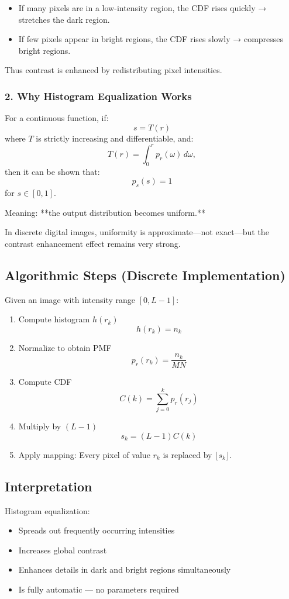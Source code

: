 \documentclass{AnantDocumentation}
\begin{document}
\begin{itemize}
\item If many pixels are in a low-intensity region, the CDF rises quickly → stretches the dark region.
\item If few pixels appear in bright regions, the CDF rises slowly → compresses bright regions.
\end{itemize}

Thus contrast is enhanced by redistributing pixel intensities.

\subsubsection{2. Why Histogram Equalization Works}

For a continuous function, if:
\[
s = T(r)
\]
where \(T\) is strictly increasing and differentiable, and:
\[
T(r) = \int_{0}^{r} p_r(\omega) \, d\omega,
\]
then it can be shown that:
\[
p_s(s) = 1
\]
for \(s \in [0,1]\).  

Meaning: **the output distribution becomes uniform.**

In discrete digital images, uniformity is approximate—not exact—but the contrast enhancement effect remains very strong.

\subsection{Algorithmic Steps (Discrete Implementation)}

Given an image with intensity range \([0, L-1]\):

\begin{enumerate}
\item Compute histogram \(h(r_k)\)
\[
h(r_k) = n_k
\]
\item Normalize to obtain PMF
\[
p_r(r_k) = \frac{n_k}{MN}
\]
\item Compute CDF
\[
C(k) = \sum_{j=0}^{k} p_r(r_j)
\]
\item Multiply by \((L-1)\)
\[
s_k = (L-1) C(k)
\]
\item Apply mapping:  
Every pixel of value \(r_k\) is replaced by \( \lfloor s_k \rfloor \).
\end{enumerate}

\subsection{Interpretation}

Histogram equalization:
\begin{itemize}
\item Spreads out frequently occurring intensities
\item Increases global contrast
\item Enhances details in dark and bright regions simultaneously
\item Is fully automatic — no parameters required
\end{itemize}
\end{document}
